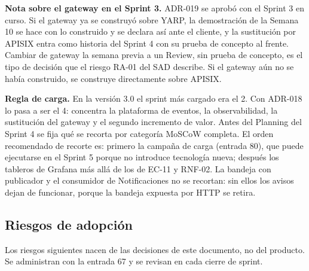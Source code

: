 \documentclass[11pt,a4paper]{article}
\begin{document}
\vspace{0.2cm}
\noindent\textbf{Nota sobre el gateway en el Sprint 3.} ADR-019 se aprobó con el Sprint 3 en curso. Si el gateway ya se construyó sobre YARP, la demostración de la Semana 10 se hace con lo construido y se declara así ante el cliente, y la sustitución por APISIX entra como historia del Sprint 4 con su prueba de concepto al frente. Cambiar de gateway la semana previa a un Review, sin prueba de concepto, es el tipo de decisión que el riesgo RA-01 del SAD describe. Si el gateway aún no se había construido, se construye directamente sobre APISIX.

\vspace{0.2cm}
\noindent\textbf{Regla de carga.} En la versión 3.0 el sprint más cargado era el 2. Con ADR-018 lo pasa a ser el 4: concentra la plataforma de eventos, la observabilidad, la sustitución del gateway y el segundo incremento de valor. Antes del Planning del Sprint 4 se fija qué se recorta por categoría MoSCoW completa. El orden recomendado de recorte es: primero la campaña de carga (entrada 80), que puede ejecutarse en el Sprint 5 porque no introduce tecnología nueva; después los tableros de Grafana más allá de los de EC-11 y RNF-02. La bandeja con publicador y el consumidor de Notificaciones no se recortan: sin ellos los avisos dejan de funcionar, porque la bandeja expuesta por HTTP se retira.

\subsection{Riesgos de adopción}
\label{sec:riesgos}

Los riesgos siguientes nacen de las decisiones de este documento, no del producto. Se administran con la entrada 67 y se revisan en cada cierre de sprint.
\end{document}
